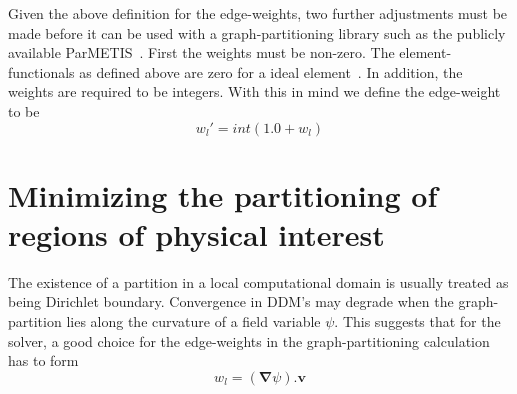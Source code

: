 \documentclass[11pt]{article}
\begin{document}
Given the above definition for the edge-weights, two further
adjustments must be made before it can be used with a
graph-partitioning library such as the publicly available
ParMETIS~\cite{parmetis}. First the weights must be non-zero. The
element-functionals as defined above are zero for a ideal
element~\cite{adapt}. In addition, the weights are required to be
integers. With this in mind we define the edge-weight to be
\begin{equation}
w_l' = int(1.0 + w_l)
\end{equation}

\section{Minimizing the partitioning of regions of physical interest}
The existence of a partition in a local computational domain is
usually treated as being Dirichlet boundary. Convergence in DDM's may
degrade when the graph-partition lies along the curvature of a field
variable $\psi$. This suggests that for the solver, a good choice for
the edge-weights in the graph-partitioning calculation has to form
\begin{equation}
w_l = \left(\pmb{\nabla}\psi \right).\pmb{v}
\end{equation}



\end{document}
